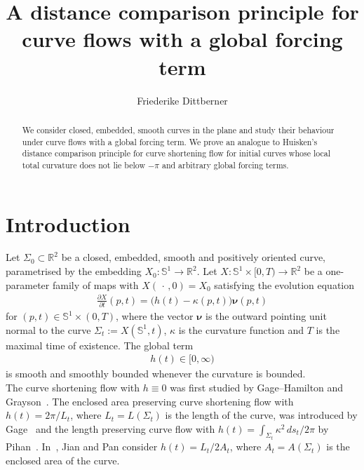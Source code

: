 \documentclass[reqno]{amsart}
\theoremstyle{definition}
\def\intst{\int_{\St}}
\def\nnu{\boldsymbol{\nu}}
\def\pa{\partial}
\def\R{\mathbb{R}}
\def\Si{\Sigma}
\def\Sp{\Sph^1}
\def\Sph{\mathbb{S}}
\def\St{\Si_t}
\newcommand{\fracp}[2]{{\frac{\pa #1}{\pa #2}}}
\begin{document}
\title{A distance comparison principle for curve flows with a global forcing term}
\author{Friederike Dittberner}

\begin{abstract}
We consider closed, embedded, smooth curves in the plane and study their behaviour under curve flows with a global forcing term.
We prove an analogue to Huisken's distance comparison principle for curve shortening flow for initial curves whose local total curvature does not lie below $-\pi$ and arbitrary global forcing terms.
\end{abstract}

\maketitle
\tableofcontents

\section{Introduction}

Let $\Si_0\subset\R^2$ be a closed, embedded, smooth and positively oriented curve, parametrised by the embedding $X_0:\Sp\to\R^2$.
Let $X:\Sp\times[0,T)\to\R^2$ be a one-parameter family of maps with $X(\,\cdot\,,0)=X_0$ satisfying the evolution equation
\begin{align}\label{eq:ccf}
\fracp{X}{t}(p,t)=\big(h(t)-\kappa(p,t)\big)\nnu(p,t)
\end{align}
for $(p,t)\in\Sp\times(0,T)$, where the vector $\nnu$ is the outward pointing unit normal to the curve $\St:=X(\Sp,t)$, $\kappa$ is the curvature function and $T$ is the maximal time of existence.
The global term 
\begin{align}\label{eq:h_1}
h(t)\in[0,\infty)
\end{align}
is smooth and smoothly bounded whenever the curvature is bounded.\\

The curve shortening flow with $h\equiv0$ was first studied by Gage--Hamilton and Grayson~\cite{GageHamilton86,Grayson87}.
The enclosed area preserving curve shortening flow with $h(t)=2\pi/L_t$, where $L_t=L(\St)$ is the length of the curve, was introduced by Gage~\cite{Gage86} and the length preserving curve flow with $h(t)=\intst\kappa^2\,ds_t/2\pi$ by Pihan~\cite{Pihan98}.
In~\cite{JianPan08}, Jian and Pan consider $h(t)=L_t/2A_t$, where $A_t=A(\St)$ is the enclosed area of the curve.\\
\end{document}
